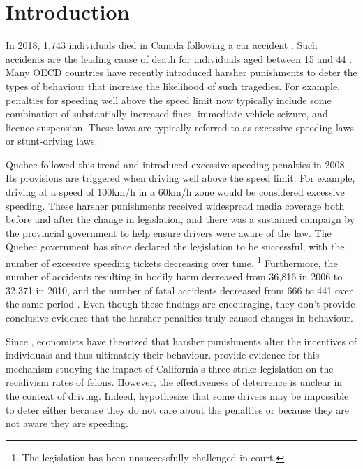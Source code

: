 \section{Introduction}
\label{sec:Introduction}

In 2018, 1,743 individuals died in Canada following a car accident 
\citep{transcan2018}. 
Such accidents are the leading cause of death for individuals aged between 15 and 44
\citep{statscan2020}.   
Many OECD countries have recently introduced harsher punishments to deter 
the types of behaviour that increase the likelihood of such tragedies. 
For example, penalties for speeding well above the speed limit now typically include 
some combination of substantially increased fines, immediate vehicle seizure, and licence suspension.
These laws are typically referred to as excessive speeding laws or stunt-driving laws. 

Quebec followed this trend and introduced excessive speeding penalties in 2008. 
Its provisions are triggered when driving well above the speed limit. 
For example, driving at a speed of 100km/h in a 60km/h zone would be considered excessive speeding.
These harsher punishments received widespread media coverage 
both before and after the change in legislation, 
and there was a sustained campaign by the provincial government 
to help ensure drivers were aware of the law. 
The Quebec government has since declared the legislation to be successful, 
with the number of excessive speeding tickets decreasing over time.%
\footnote{The legislation has been unsuccessfully challenged in court.}
%
Furthermore, the number of accidents resulting in bodily harm 
decreased from 36,816 in 2006 to 32,371 in 2010, 
and the number of fatal accidents decreased from 666 to 441 
over the same period 
\citep{saaq2011}. 
Even though these findings are encouraging, 
they don’t provide conclusive evidence that the harsher penalties truly caused changes in behaviour. 


Since 
\citet{becker1968b}, 
economists have theorized that harsher punishments 
alter the incentives of individuals and thus ultimately their behaviour. 
\citet{hellandtabarrok2007} 
provide evidence for this mechanism 
studying the impact of California’s three-strike legislation on the recidivism rates of felons. 
However, the effectiveness of deterrence is unclear in the context of driving. 
Indeed, 
\citet{bourgeonpicard2007} 
hypothesize that some drivers may be impossible to deter 
either because they do not care about the penalties or because they are not aware they are speeding.


